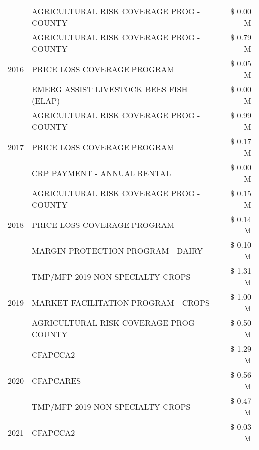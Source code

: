 \begin{tabular}{llr}
 & AGRICULTURAL RISK COVERAGE PROG - COUNTY & \$ 0.00 M \\
\cline{1-3}
\multirow[t]{3}{*}{2016} & AGRICULTURAL RISK COVERAGE PROG - COUNTY & \$ 0.79 M \\
 & PRICE LOSS COVERAGE PROGRAM & \$ 0.05 M \\
 & EMERG ASSIST LIVESTOCK BEES FISH (ELAP) & \$ 0.00 M \\
\cline{1-3}
\multirow[t]{3}{*}{2017} & AGRICULTURAL RISK COVERAGE PROG - COUNTY & \$ 0.99 M \\
 & PRICE LOSS COVERAGE PROGRAM & \$ 0.17 M \\
 & CRP PAYMENT - ANNUAL RENTAL & \$ 0.00 M \\
\cline{1-3}
\multirow[t]{3}{*}{2018} & AGRICULTURAL RISK COVERAGE PROG - COUNTY & \$ 0.15 M \\
 & PRICE LOSS COVERAGE PROGRAM & \$ 0.14 M \\
 & MARGIN PROTECTION PROGRAM - DAIRY & \$ 0.10 M \\
\cline{1-3}
\multirow[t]{3}{*}{2019} & TMP/MFP 2019 NON SPECIALTY CROPS & \$ 1.31 M \\
 & MARKET FACILITATION PROGRAM - CROPS & \$ 1.00 M \\
 & AGRICULTURAL RISK COVERAGE PROG - COUNTY & \$ 0.50 M \\
\cline{1-3}
\multirow[t]{3}{*}{2020} & CFAPCCA2 & \$ 1.29 M \\
 & CFAPCARES & \$ 0.56 M \\
 & TMP/MFP 2019 NON SPECIALTY CROPS & \$ 0.47 M \\
\cline{1-3}
2021 & CFAPCCA2 & \$ 0.03 M \\
\cline{1-3}
\bottomrule
\end{tabular}
